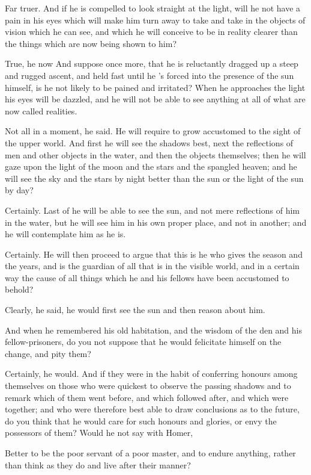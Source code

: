 Far truer.
And if he is compelled to look straight at the light, will he not have a pain in his eyes which will make him turn away to take and take in the objects of vision which he can see, and which he will conceive to be in reality clearer than the things which are now being shown to him?

True, he now
And suppose once more, that he is reluctantly dragged up a steep and rugged ascent, and held fast until he 's forced into the presence of the sun himself, is he not likely to be pained and irritated? When he approaches the light his eyes will be dazzled, and he will not be able to see anything at all of what are now called realities.

Not all in a moment, he said.
He will require to grow accustomed to the sight of the upper world. And first he will see the shadows best, next the reflections of men and other objects in the water, and then the objects themselves; then he will gaze upon the light of the moon and the stars and the spangled heaven; and he will see the sky and the stars by night better than the sun or the light of the sun by day?

Certainly.
Last of he will be able to see the sun, and not mere reflections of him in the water, but he will see him in his own proper place, and not in another; and he will contemplate him as he is.

Certainly.
He will then proceed to argue that this is he who gives the season and the years, and is the guardian of all that is in the visible world, and in a certain way the cause of all things which he and his fellows have been accustomed to behold?

Clearly, he said, he would first see the sun and then reason about him.

And when he remembered his old habitation, and the wisdom of the den and his fellow-prisoners, do you not suppose that he would felicitate himself on the change, and pity them?

Certainly, he would.
And if they were in the habit of conferring honours among themselves on those who were quickest to observe the passing shadows and to remark which of them went before, and which followed after, and which were together; and who were therefore best able to draw conclusions as to the future, do you think that he would care for such honours and glories, or envy the possessors of them? Would he not say with Homer,

Better to be the poor servant of a poor master, and to endure anything, rather than think as they do and live after their manner?

